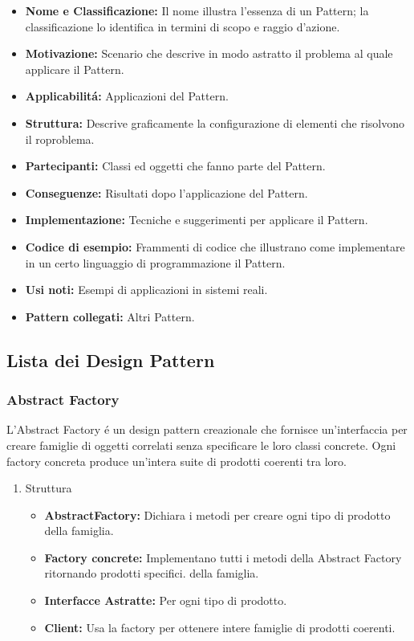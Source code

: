 \documentclass[11pt]{article}
\begin{document}
\begin{itemize}
\item \textbf{\textbf{Nome e Classificazione:}} Il nome illustra l'essenza di un Pattern; la classificazione lo identifica in termini di scopo e raggio d'azione.
\item \textbf{\textbf{Motivazione:}} Scenario che descrive in modo astratto il problema al quale applicare il Pattern.
\item \textbf{\textbf{Applicabilitá:}} Applicazioni del Pattern.
\item \textbf{\textbf{Struttura:}} Descrive graficamente la configurazione di elementi che risolvono il roproblema.
\item \textbf{\textbf{Partecipanti:}} Classi ed oggetti che fanno parte del Pattern.
\item \textbf{\textbf{Conseguenze:}} Risultati dopo l'applicazione del Pattern.
\item \textbf{\textbf{Implementazione:}} Tecniche e suggerimenti per applicare il Pattern.
\item \textbf{\textbf{Codice di esempio:}} Frammenti di codice che illustrano come implementare in un certo linguaggio di programmazione il Pattern.
\item \textbf{\textbf{Usi noti:}} Esempi di applicazioni in sistemi reali.
\item \textbf{\textbf{Pattern collegati:}} Altri Pattern.
\end{itemize}
\subsection{Lista dei Design Pattern}
\label{sec:org5ff74f4}
\subsubsection{Abstract Factory}
\label{sec:org8994738}
L'Abstract Factory é un design pattern creazionale che fornisce un'interfaccia per creare famiglie di oggetti correlati senza specificare le loro classi concrete. Ogni factory concreta produce un'intera suite di prodotti coerenti tra loro.
\begin{enumerate}
\item Struttura
\label{sec:org29c9725}
\begin{itemize}
\item \textbf{\textbf{AbstractFactory:}} Dichiara i metodi per creare ogni tipo di prodotto della famiglia.
\item \textbf{\textbf{Factory concrete:}} Implementano tutti i metodi della Abstract Factory ritornando prodotti specifici. della famiglia.
\item \textbf{\textbf{Interfacce Astratte:}} Per ogni tipo di prodotto.
\item \textbf{\textbf{Client:}} Usa la factory per ottenere intere famiglie di prodotti coerenti.
\end{itemize}
\end{enumerate}
\end{document}
